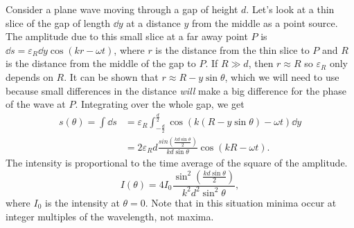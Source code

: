 \documentclass[../classical_mechanics.tex]{subfiles}
\begin{document}
            Consider a plane wave moving through a gap of height $d$.
            Let's look at a thin slice of the gap of length $\dd{y}$ at a distance $y$ from the middle as a point source.
            The amplitude due to this small slice at a far away point $P$ is $\dd{s}=\varepsilon_R\dd{y}\cos(kr-\omega t)$, where $r$ is the distance from the thin slice to $P$ and $R$ is the distance from the middle of the gap to $P$.
            If $R\gg d$, then $r\approx R$ so $\varepsilon_R$ only depends on $R$.
            It can be shown that $r\approx R-y\sin\theta$, which we will need to use because small differences in the distance \textit{will} make a big difference for the phase of the wave at $P$.
            Integrating over the whole gap, we get
            \begin{align}
                s(\theta)=\int\dd{s}&=\varepsilon_R\int_{-\frac{d}{2}}^{\frac{d}{2}}\cos(k(R-y\sin\theta)-\omega t)\dd{y}\\
                &=2\varepsilon_R d\frac{sin\left(\frac{kd\sin\theta}{2}\right)}{kd\sin\theta}\cos(kR-\omega t).
            \end{align}
            The intensity is proportional to the time average of the square of the amplitude.
            \begin{equation}
                I(\theta)=4I_0\frac{\sin^2\left(\frac{kd\sin\theta}{2}\right)}{k^2d^2\sin^2\theta},
            \end{equation}
            where $I_0$ is the intensity at $\theta=0$.
            Note that in this situation minima occur at integer multiples of the wavelength, not maxima.
\end{document}
